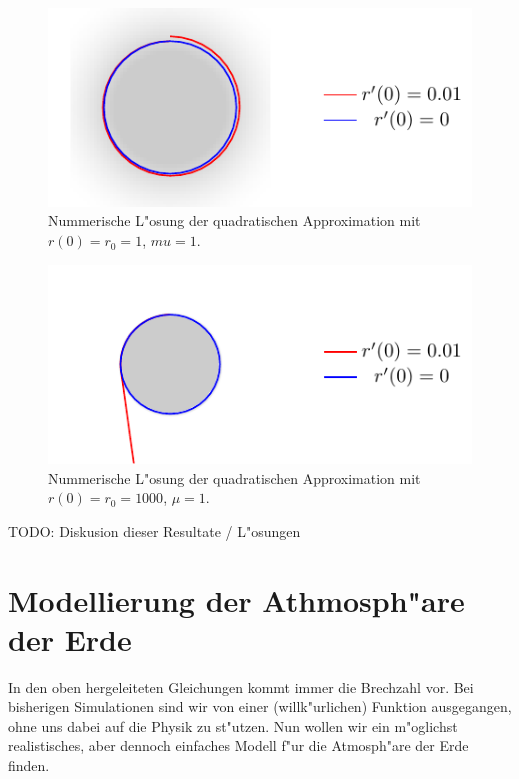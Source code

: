 \begin{refsection}
\begin{figure}
\end{figure}

\begin{figure}
  \centering
  \includegraphics[scale=1]{licht/standalone/fig_kreis_square1.pdf}
  \caption{Nummerische L"osung der quadratischen Approximation mit $r(0) = r_0 = 1$, $mu = 1$. \label{fig:sphere_special3} }
  
\end{figure}

\begin{figure}
  \centering
  \includegraphics[scale=1]{licht/standalone/fig_kreis_square2.pdf}
  \caption{Nummerische L"osung der quadratischen Approximation mit $r(0) = r_0 = 1000$,  $\mu = 1$. \label{fig:sphere_special4} } 
\end{figure}

TODO: Diskusion dieser Resultate / L"osungen

\section{Modellierung der Athmosph"are der Erde}

In den oben hergeleiteten Gleichungen kommt immer die Brechzahl vor. 
Bei bisherigen Simulationen sind wir von einer (willk"urlichen) Funktion ausgegangen, ohne uns dabei auf die Physik zu st"utzen. 
Nun wollen wir ein m"oglichst realistisches, aber dennoch einfaches Modell f"ur die Atmosph"are der Erde finden.


\end{refsection}
